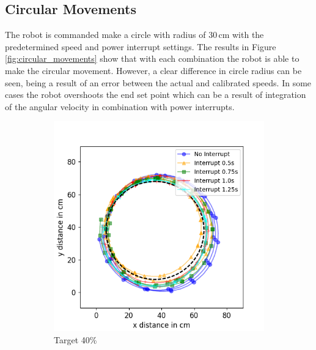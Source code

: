 \subsection{Circular Movements}

The robot is commanded make a circle with radius of 30\,cm with the predetermined speed and power interrupt settings.
The results in Figure \ref{fig:circular_movements} show that with each combination the robot is able to make the circular movement.
However, a clear difference in circle radius can be seen, being a result of an error between the actual and calibrated speeds.
In some cases the robot overshoots the end set point which can be a result of integration of the angular velocity in combination with power interrupts.

\begin{figure}[h!]
	\centering
	\begin{subfigure}[b]{0.49\textwidth}
		\includegraphics[width=\textwidth]{pics/circle_40.png}
		\caption{Target 40\%}
		\label{fig:circ_exp1}
	\end{subfigure}
	\begin{subfigure}[b]{0.49\textwidth}

\end{subfigure}
\end{figure}
